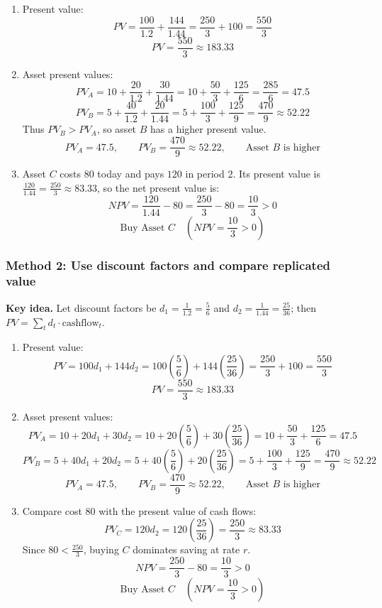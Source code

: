 \documentclass[12pt]{article}
\begin{document}
\begin{enumerate}[label=(\alph*)]
\item Present value:
$$PV = \frac{100}{1.2} + \frac{144}{1.44} = \frac{250}{3} + 100 = \frac{550}{3}$$
$$\boxed{PV = \frac{550}{3} \approx 183.33}$$

\item Asset present values:
$$PV_A = 10+\frac{20}{1.2}+\frac{30}{1.44} = 10+\frac{50}{3}+\frac{125}{6} = \frac{285}{6} = 47.5$$
$$PV_B = 5+\frac{40}{1.2}+\frac{20}{1.44} = 5+\frac{100}{3}+\frac{125}{9} = \frac{470}{9} \approx 52.22$$
Thus $PV_B > PV_A$, so asset $B$ has a higher present value.
$$\boxed{PV_A = 47.5, \qquad PV_B = \frac{470}{9} \approx 52.22, \qquad \text{Asset } B \text{ is higher}}$$

\item Asset $C$ costs $80$ today and pays $120$ in period 2.
Its present value is $\frac{120}{1.44} = \frac{250}{3} \approx 83.33$, so the net present value is:
$$NPV = \frac{120}{1.44} - 80 = \frac{250}{3} - 80 = \frac{10}{3} > 0$$
$$\boxed{\text{Buy Asset } C \quad \left(NPV = \frac{10}{3} > 0\right)}$$
\end{enumerate}

\subsubsection{Method 2: Use discount factors and compare replicated value}
\noindent\textbf{Key idea.} Let discount factors be $d_1=\frac{1}{1.2}=\frac{5}{6}$ and $d_2=\frac{1}{1.44}=\frac{25}{36}$; then $PV=\sum_t d_t \cdot \text{cashflow}_t$.

\begin{enumerate}[label=(\alph*)]
\item Present value:
$$PV = 100d_1 + 144d_2 = 100\left(\frac{5}{6}\right) + 144\left(\frac{25}{36}\right) = \frac{250}{3} + 100 = \frac{550}{3}$$
$$\boxed{PV = \frac{550}{3} \approx 183.33}$$

\item Asset present values:
$$PV_A = 10 + 20d_1 + 30d_2 = 10 + 20\left(\frac{5}{6}\right) + 30\left(\frac{25}{36}\right) = 10 + \frac{50}{3} + \frac{125}{6} = 47.5$$
$$PV_B = 5 + 40d_1 + 20d_2 = 5 + 40\left(\frac{5}{6}\right) + 20\left(\frac{25}{36}\right) = 5 + \frac{100}{3} + \frac{125}{9} = \frac{470}{9} \approx 52.22$$
$$\boxed{PV_A = 47.5, \qquad PV_B = \frac{470}{9} \approx 52.22, \qquad \text{Asset } B \text{ is higher}}$$

\item Compare cost $80$ with the present value of cash flows:
$$PV_C = 120d_2 = 120\left(\frac{25}{36}\right) = \frac{250}{3} \approx 83.33$$
Since $80 < \frac{250}{3}$, buying $C$ dominates saving at rate $r$.
$$NPV = \frac{250}{3} - 80 = \frac{10}{3} > 0$$
$$\boxed{\text{Buy Asset } C \quad \left(NPV = \frac{10}{3} > 0\right)}$$
\end{enumerate}
\end{document}
